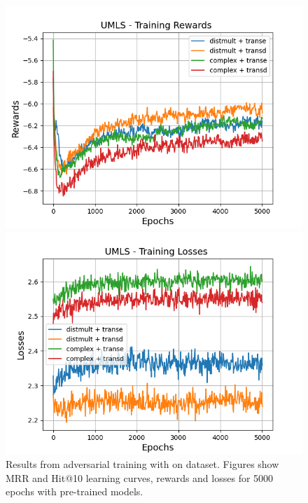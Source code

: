 \begin{figure}[H]
    \begin{minipage}{.5\textwidth}
      \centering
      \includegraphics[width=\linewidth]{figures/results/gan_train/pretrained/random/umls/gan_train_random_umls_rewards.png}
    \end{minipage}%
     \begin{minipage}{.5\textwidth}
      \centering
      \includegraphics[width=\linewidth]{figures/results/gan_train/pretrained/random/umls/gan_train_random_umls_losses.png}
    \end{minipage}%
    \caption{Results from adversarial training with \origsampling on \umls dataset.
    Figures show MRR and Hit@10 learning curves, rewards and losses for 5000 epochs with pre-trained models.}
    \label{fig:gan_train_pretrained_random_umls}
\end{figure}
